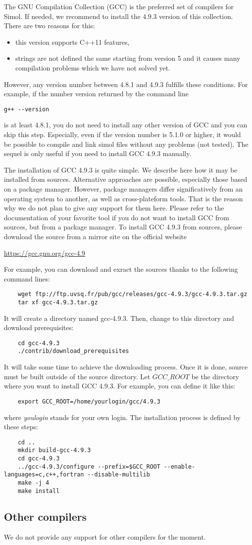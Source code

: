 The GNU Compilation Collection (GCC) is the preferred set of compilers for Simol. If needed, we recommend to install the 4.9.3 version of this collection. There are two reasons for this:
\begin{itemize}
\item this version supports C++11 features,
\item strings are not defined the same starting from version 5 and it causes many compilation problems which we have not solved yet.
\end{itemize}
However, any version number between 4.8.1 and 4.9.3 fulfills these conditions. For example, if the number version returned by the command line
\begin{verbatim}
g++ --version
\end{verbatim}
is at least 4.8.1, you do not need to install any other version of GCC and you can skip this step. Especially, even if the version number is 5.1.0 or higher, it would be possible to compile and link simol files without any problems (not tested). The sequel is only useful if you need to install GCC 4.9.3 manually. 

The installation of GCC 4.9.3 is quite simple. We describe here how it may be installed from sources. Alternative approaches are possible, especially those based on a package manager. However, package managers differ significatively from an operating system to another, as well as cross-plateform tools. That is the reason why we do not plan to give any support for them here. Please refer to the documentation of your favorite tool if you do not want to install GCC from sources, but from a package manager. To install GCC 4.9.3 from sources, please download the source from a mirror site on the official website 
\begin{center}
	\url{https://gcc.gnu.org/gcc-4.9}
\end{center}
For example, you can download and exract the sources thanks to the following command lines:
\begin{verbatim}
	wget ftp://ftp.uvsq.fr/pub/gcc/releases/gcc-4.9.3/gcc-4.9.3.tar.gz
	tar xf gcc-4.9.3.tar.gz
\end{verbatim}
It will create a directory named gcc-4.9.3. Then, change to this directory and download prerequisites:
\begin{verbatim}
	cd gcc-4.9.3
	./contrib/download_prerequisites
\end{verbatim}
It will take some time to achieve the downloading process. Once it is done, source must be built outside of the source directory. Let $GCC\_ROOT$ be the directory where you want to install GCC 4.9.3. For example, you can define it like this:
\begin{verbatim}
	export GCC_ROOT=/home/yourlogin/gcc/4.9.3
\end{verbatim}
where \textit{youlogin} stands for your own login. The installation process is defined by these steps:
\begin{verbatim}
	cd ..
	mkdir build-gcc-4.9.3
	cd gcc-4.9.3
	../gcc-4.9.3/configure --prefix=$GCC_ROOT --enable-languages=c,c++,fortran --disable-multilib
	make -j 4
	make install
\end{verbatim}




\subsection{Other compilers}

We do not provide any support for other compilers for the moment.